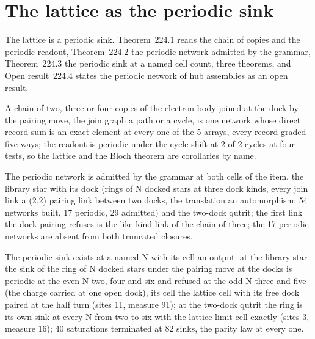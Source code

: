 \section{The lattice as the periodic sink}\label{mod:XII-1-lattice-as-the-periodic-sink}
\label{narr:open:12-1}The lattice is a periodic sink. Theorem~224.1 reads the chain of copies and the periodic readout, Theorem~224.2 the periodic network admitted by the grammar, Theorem~224.3 the periodic sink at a named cell count, three theorems, and Open result~224.4 states the periodic network of hub assemblies as an open result.
\begin{chtheorem}\label{box:XII-1-lattice-as-the-periodic-sink:1}
A chain of two, three or four copies of the electron body joined at the dock by the pairing move, the join graph a path or a cycle, is one network whose direct record sum is an exact element at every one of the 5 arrays, every record graded five ways; the readout is periodic under the cycle shift at 2 of 2 cycles at four tests, so the lattice and the Bloch theorem are corollaries by name.
\end{chtheorem}
\begin{chtheorem}\label{box:XII-1-lattice-as-the-periodic-sink:2}
The periodic network is admitted by the grammar at both cells of the item, the library star with its dock (rings of N docked stars at three dock kinds, every join link a (2,2) pairing link between two docks, the translation an automorphism; 54 networks built, 17 periodic, 29 admitted) and the two-dock qutrit; the first link the dock pairing refuses is the like-kind link of the chain of three; the 17 periodic networks are absent from both truncated closures.
\end{chtheorem}
\begin{chtheorem}\label{box:XII-1-lattice-as-the-periodic-sink:3}
The periodic sink exists at a named N with its cell an output: at the library star the sink of the ring of N docked stars under the pairing move at the docks is periodic at the even N two, four and six and refused at the odd N three and five (the charge carried at one open dock), its cell the lattice cell with its free dock paired at the half turn (sites 11, measure 91); at the two-dock qutrit the ring is its own sink at every N from two to six with the lattice limit cell exactly (sites 3, measure 16); 40 saturations terminated at 82 sinks, the parity law at every one.
\end{chtheorem}
